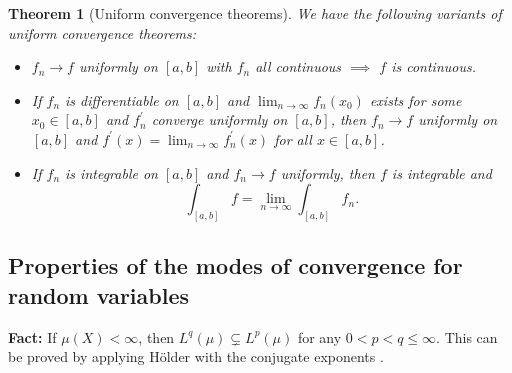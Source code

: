 \documentclass[12pt,reqno]{article}
\theoremstyle{plain}
\newtheorem{theorem}{Theorem}[section]
\theoremstyle{definition}
\begin{document}
\begin{theorem}[Uniform convergence theorems]
We have the following variants of uniform convergence theorems: 
\begin{itemize} 
\item $f_n \rightarrow f$ uniformly on $[a, b]$ with $f_n$ all continuous $\implies$ 
     $f$ is continuous. 
\item If $f_n$ is differentiable on $[a,b]$ and $\lim_{n \rightarrow \infty} f_n(x_0)$ 
     exists for some $x_0 \in [a,b]$ and $f_n^{\prime}$ converge uniformly on $[a,b]$, then 
     $f_n \rightarrow f$ uniformly on $[a,b]$ and 
     $f^{\prime}(x) = \lim_{n \rightarrow \infty} f_n^{\prime}(x)$ for all $x \in [a,b]$. 
\item If $f_n$ is integrable on $[a,b]$ and $f_n \rightarrow f$ uniformly, then 
     $f$ is integrable and 
     \[
     \int_{[a,b]} f = \lim_{n \rightarrow \infty} \int_{[a,b]} f_n. 
     \]
\end{itemize} 
\end{theorem}

\subsection{Properties of the modes of convergence for random variables} 


\textbf{Fact:} If $\mu(X) < \infty$, then $L^q(\mu) \subsetneq L^p(\mu)$ for any 
$0 < p < q \leq \infty$. This can be proved by applying H\"older with the conjugate 
exponents . 
\end{document}

